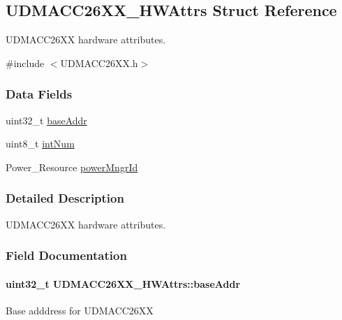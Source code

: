 \subsection{U\-D\-M\-A\-C\-C26\-X\-X\-\_\-\-H\-W\-Attrs Struct Reference}
\label{struct_u_d_m_a_c_c26_x_x___h_w_attrs}


U\-D\-M\-A\-C\-C26\-X\-X hardware attributes.  




{\ttfamily \#include $<$U\-D\-M\-A\-C\-C26\-X\-X.\-h$>$}

\subsubsection*{Data Fields}
\begin{DoxyCompactItemize}
\item 
uint32\-\_\-t \hyperlink{struct_u_d_m_a_c_c26_x_x___h_w_attrs_a62ff254a8b85ecced4f749c35065515d}{base\-Addr}
\item 
uint8\-\_\-t \hyperlink{struct_u_d_m_a_c_c26_x_x___h_w_attrs_a842b5f7c2c0a2563eaf6f037cff07785}{int\-Num}
\item 
Power\-\_\-\-Resource \hyperlink{struct_u_d_m_a_c_c26_x_x___h_w_attrs_a3dd30c452d16f3ffa55696fc15852c0b}{power\-Mngr\-Id}
\end{DoxyCompactItemize}


\subsubsection{Detailed Description}
U\-D\-M\-A\-C\-C26\-X\-X hardware attributes. 

\subsubsection{Field Documentation}
\paragraph[{base\-Addr}]{\setlength{\rightskip}{0pt plus 5cm}uint32\-\_\-t U\-D\-M\-A\-C\-C26\-X\-X\-\_\-\-H\-W\-Attrs\-::base\-Addr}\label{struct_u_d_m_a_c_c26_x_x___h_w_attrs_a62ff254a8b85ecced4f749c35065515d}
Base adddress for U\-D\-M\-A\-C\-C26\-X\-X 

